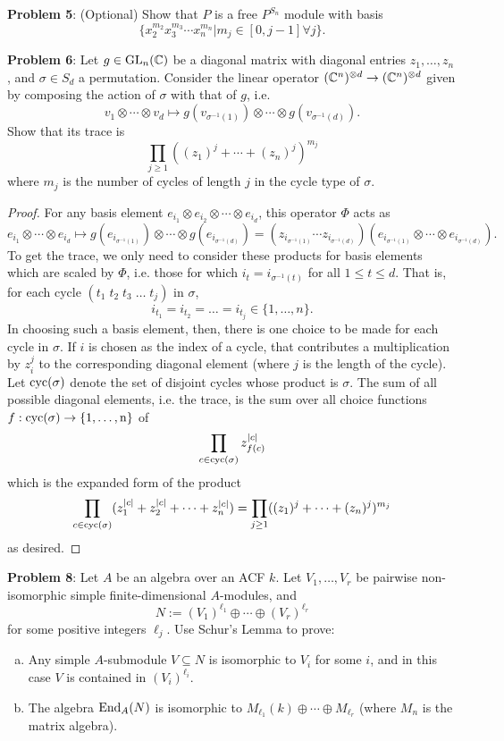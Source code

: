 \documentclass{amsart}
\begin{document}
	\newpage 
	\textbf{Problem 5}: (Optional) Show that $P$ is a free $P^{S_n}$ module with basis 
	$$
	\{x_2^{m_2}x_3^{m_3}\cdots x_n^{m_n} | m_j \in [0,j-1] \forall j\}.
	$$
	
	\newpage 
	\textbf{Problem 6}: Let $g\in \operatorname{GL}_n(\mathbb{C})$ be a diagonal matrix with diagonal entries $z_1,\dots,z_n$, and $\sigma\in S_d$ a permutation. Consider the linear operator $(\mathbb{C}^n)^{\otimes d}\to(\mathbb{C}^n)^{\otimes d}$ given by composing the action of $\sigma$ with that of $g$, i.e.
	$$
	v_1\otimes \cdots \otimes v_d \mapsto g(v_{\sigma^{-1}(1)})\otimes \cdots \otimes g(v_{\sigma^{-1}(d)}).
	$$
	Show that its trace is
	$$
	\prod_{j\geq 1} ((z_1)^j + \cdots + (z_n)^j)^{m_j}
	$$
	where $m_j$ is the number of cycles of length $j$ in the cycle type of $\sigma$.
	\begin{proof}
		For any basis element $e_{i_1}\otimes e_{i_2}\otimes \cdots \otimes e_{i_d}$, this operator $\Phi$ acts as
		$$
		e_{i_1}\otimes \cdots \otimes e_{i_d} \mapsto g(e_{i_{\sigma^{-1}(1)}}) \otimes \cdots \otimes g(e_{i_{\sigma^{-1}(d)}}) = (z_{i_{\sigma^{-1}(1)}}\cdots z_{i_{\sigma^{-1}(d)}}) (e_{i_{\sigma^{-1}(1)}}\otimes \cdots \otimes e_{i_{\sigma^{-1}(d)}}).
		$$
		To get the trace, we only need to consider these products for basis elements which are scaled by $\Phi$, i.e. those for which $i_t = i_{\sigma^{-1}(t)}$ for all $1\leq t \leq d$. That is, for each cycle $(t_1 \; t_2 \; t_3 \; \dots \; t_j)$ in $\sigma$, $$i_{t_1}=i_{t_2}=\dots=i_{t_j} \in \{1,\dots,n\}.$$
		In choosing such a basis element, then, there is one choice to be made for each cycle in $\sigma$. If $i$ is chosen as the index of a cycle, that contributes a multiplication by $z_i^j$ to the corresponding diagonal element (where $j$ is the length of the cycle). Let $\rm{cyc}(\sigma)$ denote the set of disjoint cycles whose product is $\sigma$. The sum of all possible diagonal elements, i.e. the trace, is the sum over all choice functions $f:\rm{cyc}(\sigma)\to \{1,\dots,n\}$ of
		$$
		\prod_{c\in \rm{cyc}(\sigma)} z_{f(c)}^{|c|}
		$$
		which is the expanded form of the product
		$$\prod_{c\in \rm{cyc}(\sigma)} (z_1^{|c|} + z_2^{|c|} + \dots + z_n^{|c|}) =
		\prod_{j\geq 1} ((z_1)^j + \cdots + (z_n)^j)^{m_j}
		$$
		as desired.
	\end{proof}
	
	
	\newpage 
	\textbf{Problem 8}: Let $A$ be an algebra over an ACF $k$. Let $V_1,\dots,V_r$ be pairwise non-isomorphic simple finite-dimensional $A$-modules, and 
	$$
	N := (V_1)^{\ell_1}\oplus \cdots \oplus (V_r)^{\ell_r}
	$$ 
	for some positive integers $\ell_j$. Use Schur's Lemma to prove:
	\begin{enumerate}[(a)]
		\item Any simple $A$-submodule $V\subseteq N$ is isomorphic to $V_i$ for some $i$, and in this case $V$ is contained in $(V_i)^{\ell_i}$.
		\item The algebra $\operatorname{End}_A(N)$ is isomorphic to $M_{\ell_1}(k)\oplus \cdots \oplus M_{\ell_r}$ (where $M_n$ is the matrix algebra).
	\end{enumerate}
	
\end{document}
